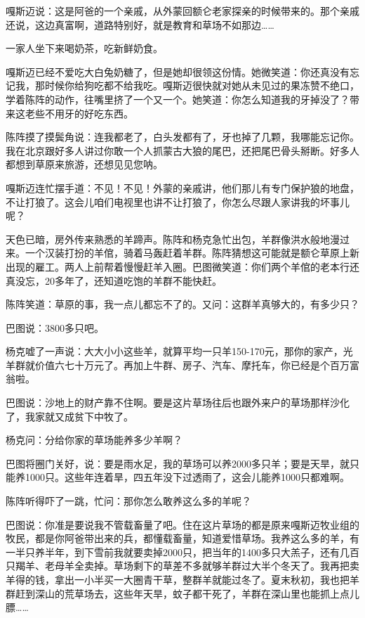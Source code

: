 \par 嘎斯迈说：这是阿爸的一个亲戚，从外蒙回额仑老家探亲的时候带来的。那个亲戚还说，这边真富啊，道路特别好，就是教育和草场不如那边……
\par 一家人坐下来喝奶茶，吃新鲜奶食。
\par 嘎斯迈已经不爱吃大白兔奶糖了，但是她却很领这份情。她微笑道：你还真没有忘记我，那时候你给狗吃都不给我吃。嘎斯迈很快就对她从未见过的果冻赞不绝口，学着陈阵的动作，往嘴里挤了一个又一个。她笑道：你怎么知道我的牙掉没了？带来这老些不用牙的好吃东西。
\par 陈阵摸了摸鬓角说：连我都老了，白头发都有了，牙也掉了几颗，我哪能忘记你。我在北京跟好多人讲过你敢一个人抓蒙古大狼的尾巴，还把尾巴骨头掰断。好多人都想到草原来旅游，还想见见您呐。
\par 嘎斯迈连忙摆手道：不见！不见！外蒙的亲戚讲，他们那儿有专门保护狼的地盘，不让打狼了。这会儿咱们电视里也讲不让打狼了，你怎么尽跟人家讲我的坏事儿呢？
\par 天色已暗，房外传来熟悉的羊蹄声。陈阵和杨克急忙出包，羊群像洪水般地漫过来。一个汉装打扮的羊倌，骑着马轰赶着羊群。陈阵猜想这可能就是额仑草原上新出现的雇工。两人上前帮着慢慢赶羊入圈。巴图微笑道：你们两个羊倌的老本行还真没忘，20多年了，还知道吃饱的羊群不能快赶。
\par 陈阵笑道：草原的事，我一点儿都忘不了的。又问：这群羊真够大的，有多少只？
\par 巴图说：3800多只吧。
\par 杨克嘘了一声说：大大小小这些羊，就算平均一只羊150-170元，那你的家产，光羊群就价值六七十万元了。再加上牛群、房子、汽车、摩托车，你已经是个百万富翁啦。
\par 巴图说：沙地上的财产靠不住啊。要是这片草场往后也跟外来户的草场那样沙化了，我家就又成贫下中牧了。
\par 杨克问：分给你家的草场能养多少羊啊？
\par 巴图将圈门关好，说：要是雨水足，我的草场可以养2000多只羊；要是天旱，就只能养1000只。这些年连着旱，四五年没下过透雨了，这会儿能养1000只都难啊。
\par 陈阵听得吓了一跳，忙问：那你怎么敢养这么多的羊呢？
\par 巴图说：你准是要说我不管载畜量了吧。住在这片草场的都是原来嘎斯迈牧业组的牧民，都是你阿爸带出来的兵，都懂载畜量，知道爱惜草场。我养这么多的羊，有一半只养半年，到下雪前我就要卖掉2000只，把当年的1400多只大羔子，还有几百只羯羊、老母羊全卖掉。草场剩下的草差不多就够羊群过大半个冬天了。我再把卖羊得的钱，拿出一小半买一大圈青干草，整群羊就能过冬了。夏末秋初，我也把羊群赶到深山的荒草场去，这些年天旱，蚊子都干死了，羊群在深山里也能抓上点儿膘……
